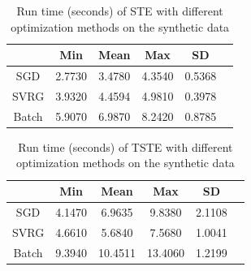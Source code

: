 \documentclass[letterpaper]{article}
\begin{document}
		\begin{table}[ht]
			\centering
			\begin{tabular}{c||c c c c c }
				\hline
						& Min 	 & Mean 	& Max 		& SD 		\\ \hline \hline
				SGD 	& 2.7730 & 3.4780 	& 4.3540 	& 0.5368 	\\  \hline
				SVRG 	& 3.9320 & 4.4594 	& 4.9810 	& 0.3978 	\\  \hline
				Batch 	& 5.9070 & 6.9870 	& 8.2420 	& 0.8785 	\\  \hline
			\end{tabular}
			\caption{Run time (seconds) of STE with different optimization methods on the synthetic data}\label{tab_2}
		\end{table}
		\begin{table}[ht]
			\centering
			\begin{tabular}{c||c c c c c }
				\hline
						& Min 	 & Mean 	& Max 		& SD 		\\ \hline \hline
				SGD 	& 4.1470 & 6.9635 	& 9.8380 	& 2.1108 	\\    \hline
				SVRG 	& 4.6610 & 5.6840 	& 7.5680 	& 1.0041 	\\    \hline
				Batch 	& 9.3940 & 10.4511 	& 13.4060 	& 1.2199 	\\    \hline
			\end{tabular}
			\caption{{Run time (seconds) of TSTE with different optimization methods on the synthetic data}}\label{tab_3}
		\end{table}
\end{document}
